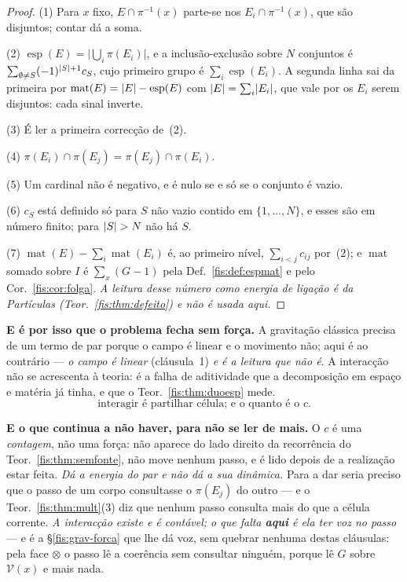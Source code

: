 \documentclass[livro.tex]{subfiles}
\begin{document}
\begin{proof}
(1) Para $x$ fixo, $E\cap\pi^{-1}(x)$ parte-se nos $E_i\cap\pi^{-1}(x)$, que são
disjuntos; contar dá a soma.

(2) $\operatorname{esp}(E)=\lvert\bigcup_i\pi(E_i)\rvert$, e a inclusão-exclusão
sobre $N$ conjuntos é
$\sum_{\emptyset\neq S}(-1)^{\lvert S\rvert+1}c_S$, cujo primeiro grupo é
$\sum_i\operatorname{esp}(E_i)$. A segunda linha sai da primeira por
$\operatorname{mat}(E)=\lvert E\rvert-\operatorname{esp}(E)$ com
$\lvert E\rvert=\sum_i\lvert E_i\rvert$, que vale por os $E_i$ serem disjuntos: cada sinal
inverte.

(3) É ler a primeira correcção de~(2).

(4) $\pi(E_i)\cap\pi(E_j)=\pi(E_j)\cap\pi(E_i)$.

(5) Um cardinal não é negativo, e é nulo se e só se o conjunto é vazio.

(6) $c_S$ está definido só para $S$ não vazio contido em $\{1,\dots,N\}$, e esses
são em número finito; para $\lvert S\rvert>N$ não há $S$.

(7) $\operatorname{mat}(E)-\sum_i\operatorname{mat}(E_i)$ é, ao primeiro nível,
$\sum_{i<j}c_{ij}$ por~(2); e $\operatorname{mat}$ somado sobre $I$ é
$\sum_x(G-1)$ pela Def.~\ref{fis:def:espmat} e pelo Cor.~\ref{fis:cor:folga}.
\emph{A leitura desse número como energia de ligação é da Partículas
(Teor.~\ref{fis:thm:defeito}) e não é usada aqui.}
\end{proof}

\medskip\noindent\textbf{E é por isso que o problema fecha sem força.} A
gravitação clássica precisa de um termo de par porque o campo é linear e o
movimento não; aqui é ao contrário --- \emph{o campo é linear} (cláusula~1) \emph{e
é a leitura que não é}. A interacção não se acrescenta à teoria: é a falha de
aditividade que a decomposição em espaço e matéria já tinha, e que o
Teor.~\ref{fis:thm:duoesp} mede.
\[
\boxed{\;\text{interagir é partilhar célula; e o quanto é o }c.\;}
\]

\medskip\noindent\textbf{E o que continua a não haver, para não se ler de mais.}
O $c$ é uma \emph{contagem}, não uma força: não aparece do lado direito da
recorrência do Teor.~\ref{fis:thm:semfonte}, não move nenhum passo, e é lido
depois de a realização estar feita. \emph{Dá a energia do par e não dá a sua
dinâmica.} Para a dar seria preciso que o passo de um corpo consultasse o
$\pi(E_j)$ do outro --- e o Teor.~\ref{fis:thm:mult}(3) diz que nenhum passo
consulta mais do que a célula corrente. \emph{A interacção existe e é contável; o
que falta \textbf{aqui} é ela ter voz no passo} --- e é a §\ref{fis:grav-forca}
que lhe dá voz, sem quebrar nenhuma destas cláusulas: pela face $\otimes$ o passo
lê a coerência sem consultar ninguém, porque lê $G$ sobre $\mathcal{V}(x)$ e mais
nada.
\end{document}
